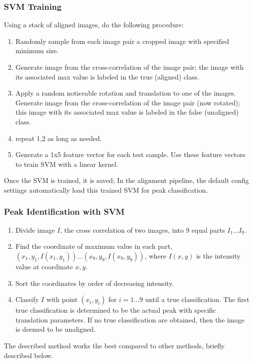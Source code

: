 \documentclass{article}
\begin{document}
\subsubsection{SVM Training}
Using a stack of aligned images, do the following procedure:
\begin{enumerate}
\item Randomly sample from each image pair a cropped image with specified minimum size.
\item Generate image from the cross-correlation of the image pair; the image with its associated max value is labeled in the true (aligned) class.
\item Apply a random noticeable rotation and translation to one of the images. Generate image from the cross-correlation of the image pair (now rotated); this image with its associated max value is labeled in the false (unaligned) class. 
\item repeat 1,2 as long as needed.
\item Generate a 1x5 feature vector for each test sample. Use these feature vectors to train SVM with a linear kernel. 
\end{enumerate}
Once the SVM is trained, it is saved; In the alignment pipeline, the default config settings automatically load this trained SVM for peak classification.

\subsubsection{Peak Identification with SVM}
\begin{enumerate}
\item Divide image $I$, the cross correlation of two images, into 9 equal parts $I_1...I_9$.
\item Find the coordinate of maximum value in each part, $(x_1,y_1, I(x_1, y_1))...(x_9,y_9, I(x_9,y_9))$, where $I(x,y)$ is the intensity value at coordinate $x,y$. 
\item Sort the coordinates by order of decreasing intensity.
\item Classify $I$ with point $(x_i, y_i)$ for $i=1...9$ until a true classification.
The first true classification is determined to be the actual peak with specific translation parameters. If no true classification are obtained, then the image is deemed to be unaligned. 
\end{enumerate}
The described method works the best compared to other methods, briefly described below.\\
\end{document}
